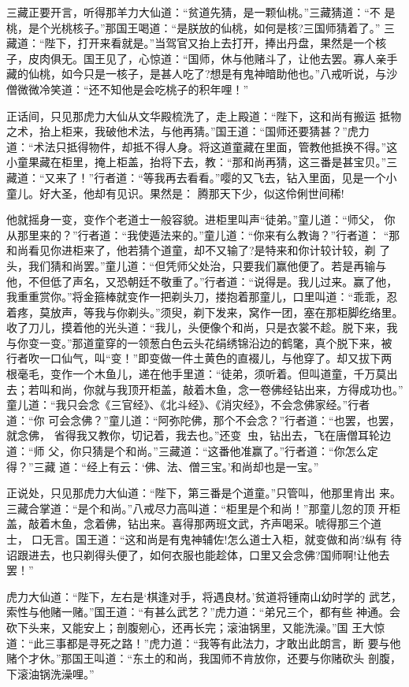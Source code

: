 三藏正要开言，听得那羊力大仙道：“贫道先猜，是一颗仙桃。”三藏猜道：“不
是桃，是个光桃核子。”那国王喝道：“是朕放的仙桃，如何是核?三国师猜着了。”
三藏道：“陛下，打开来看就是。”当驾官又抬上去打开，捧出丹盘，果然是一个核
子，皮肉俱无。国王见了，心惊道：“国师，休与他赌斗了，让他去罢。寡人亲手
藏的仙桃，如今只是一核子，是甚人吃了?想是有鬼神暗助他也。”八戒听说，与沙
僧微微冷笑道：“还不知他是会吃桃子的积年哩！”

正话间，只见那虎力大仙从文华殿梳洗了，走上殿道：“陛下，这和尚有搬运
抵物之术，抬上柜来，我破他术法，与他再猜。”国王道：“国师还要猜甚？”虎力
道：“术法只抵得物件，却抵不得人身。将这道童藏在里面，管教他抵换不得。”这
小童果藏在柜里，掩上柜盖，抬将下去，教：“那和尚再猜，这三番是甚宝贝。”三
藏道：“又来了！”行者道：“等我再去看看。”嘤的又飞去，钻入里面，见是一个小
童儿。好大圣，他却有见识。果然是：
腾那天下少，似这伶俐世间稀!

他就摇身一变，变作个老道士一般容貌。进柜里叫声“徒弟。”童儿道：“师父，
你从那里来的？”行者道：“我使遁法来的。”童儿道：“你来有么教诲？”行者道：
“那和尚看见你进柜来了，他若猜个道童，却不又输了?是特来和你计较计较，剃
了头，我们猜和尚罢。”童儿道：“但凭师父处治，只要我们赢他便了。若是再输与
他，不但低了声名，又恐朝廷不敬重了。”行者道：“说得是。我儿过来。赢了他，
我重重赏你。”将金箍棒就变作一把剃头刀，搂抱着那童儿，口里叫道：“乖乖，忍
着疼，莫放声，等我与你剃头。”须臾，剃下发来，窝作一团，塞在那柜脚纥络里。
收了刀儿，摸着他的光头道：“我儿，头便像个和尚，只是衣裳不趁。脱下来，我
与你变一变。”那道童穿的一领葱白色云头花绢绣锦沿边的鹤氅，真个脱下来，被
行者吹一口仙气，叫“变！”即变做一件土黄色的直裰儿，与他穿了。却又拔下两
根毫毛，变作一个木鱼儿，递在他手里道：“徒弟，须听着。但叫道童，千万莫出
去；若叫和尚，你就与我顶开柜盖，敲着木鱼，念一卷佛经钻出来，方得成功也。”
童儿道：“我只会念《三官经》、《北斗经》、《消灾经》，不会念佛家经。”行者道：“你
可会念佛？”童儿道：“阿弥陀佛，那个不会念？”行者道：“也罢，也罢，就念佛，
省得我又教你，切记着，我去也。”还变虫，钻出去，飞在唐僧耳轮边道：“师
父，你只猜是个和尚。”三藏道：“这番他准赢了。”行者道：“你怎么定得？”三藏
道：“经上有云：‘佛、法、僧三宝。’和尚却也是一宝。”

正说处，只见那虎力大仙道：“陛下，第三番是个道童。”只管叫，他那里肯出
来。三藏合掌道：“是个和尚。”八戒尽力高叫道：“柜里是个和尚！”那童儿忽的顶
开柜盖，敲着木鱼，念着佛，钻出来。喜得那两班文武，齐声喝采。唬得那三个道
士，口无言。国王道：“这和尚是有鬼神辅佐!怎么道士入柜，就变做和尚?纵有
待诏跟进去，也只剃得头便了，如何衣服也能趁体，口里又会念佛?国师啊!让他去
罢！”

虎力大仙道：“陛下，左右是‘棋逢对手，将遇良材。’贫道将锺南山幼时学的
武艺，索性与他赌一赌。”国王道：“有甚么武艺？”虎力道：“弟兄三个，都有些
神通。会砍下头来，又能安上；剖腹剜心，还再长完；滚油锅里，又能洗澡。”国
王大惊道：“此三事都是寻死之路！”虎力道：“我等有此法力，才敢出此朗言，断
要与他赌个才休。”那国王叫道：“东土的和尚，我国师不肯放你，还要与你赌砍头
剖腹，下滚油锅洗澡哩。”

